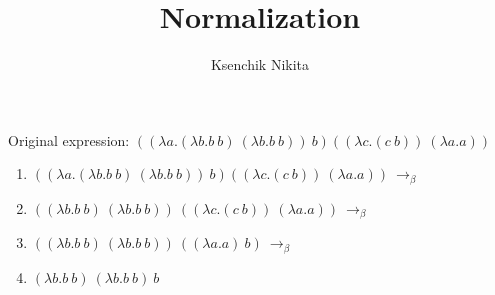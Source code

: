 \documentclass{article}
\title{Normalization}
\author{Ksenchik Nikita}
\begin{document}
\maketitle

Original expression:
$((\lambda a.(\lambda b.b\ b)\ (\lambda b.b\ b))\ b) ((\lambda c.(c\ b))\ (\lambda a.a))$

\begin{enumerate}
    \item $((\lambda a.(\lambda b.b\ b)\ (\lambda b.b\ b))\ b) ((\lambda c.(c\ b))\ (\lambda a.a))\ \rightarrow_\beta$
    \item $((\lambda b.b\ b)\ (\lambda b.b\ b))\ ((\lambda c.(c\ b))\ (\lambda a.a))\ \rightarrow_\beta$
    \item $((\lambda b.b\ b)\ (\lambda b.b\ b))\ ( (\lambda a.a)\ b)\ \rightarrow_\beta$
    \item $(\lambda b.b\ b)\ (\lambda b.b\ b)\ b$

\end{enumerate}
\end{document}
